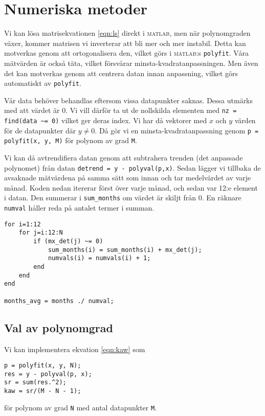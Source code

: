 \section{Numeriska metoder}
\label{sec:metoder}

Vi kan lösa matrisekvationen \ref{eqn:ls} direkt i \textsc{matlab}, men när polynomgraden växer, kommer matrisen vi inverterar att bli mer och mer instabil. Detta kan motverkas genom att ortogonalisera den, vilket görs i \textsc{matlab}:s \lstinline|polyfit|. Våra mätvärden är också täta, vilket försvårar minsta-kvadratanpassningen. Men även det kan motverkas genom att centrera datan innan anpassning, vilket görs automatiskt av \lstinline|polyfit|.

Vår data behöver behandlas eftersom vissa datapunkter saknas. Dessa utmärks med att värdet är 0. Vi vill därför ta ut de nollskilda elementen med \lstinline|nz = find(data ~= 0)| vilket ger deras index. Vi har då vektorer med $x$ och $y$ värden för de datapunkter där $ y \neq 0$. Då gör vi en minsta-kvadratanpassning genom \lstinline|p = polyfit(x, y, M)| för polynom av grad \lstinline|M|.

Vi kan då avtrendifiera datan genom att subtrahera trenden (det anpassade polynomet) från datan \lstinline|detrend = y - polyval(p,x)|. Sedan lägger vi tillbaka de avsaknade mätvärdena på samma sätt som innan och tar medelvärdet av varje månad. Koden nedan itererar först över varje månad, och sedan var 12:e element i datan. Den summerar i \lstinline|sum_months| om värdet är skiljt från 0. En räknare \lstinline|numval| håller reda på antalet termer i summan. 
\begin{lstlisting}
for i=1:12
    for j=i:12:N
        if (mx_det(j) ~= 0)
            sum_months(i) = sum_months(i) + mx_det(j);
            numvals(i) = numvals(i) + 1;
        end
    end
end

months_avg = months ./ numval;
\end{lstlisting}

\subsection{Val av polynomgrad}

Vi kan implementera ekvation \ref{eqn:kaw} som 
\begin{lstlisting}
p = polyfit(x, y, N);
res = y - polyval(p, x);
sr = sum(res.^2);
kaw = sr/(M - N - 1);
\end{lstlisting}
för polynom av grad \lstinline|N| med antal datapunkter \lstinline|M|.